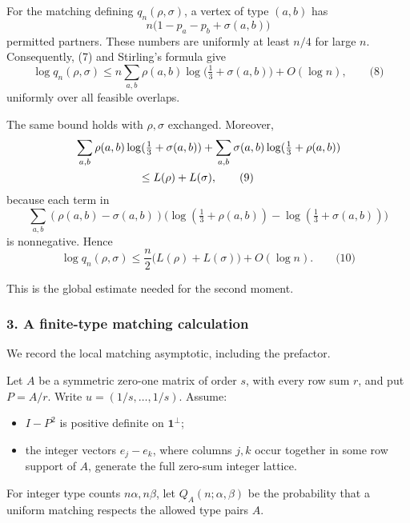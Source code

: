 \documentclass[
  11pt,
  a4paper,
]{article}
\providecommand{\tightlist}{%
  \setlength{\itemsep}{0pt}\setlength{\parskip}{0pt}}
\begin{document}
For the matching defining \(q_n(\rho,\sigma)\), a vertex of type
\((a,b)\) has \[
n\bigl(1-p_a-p_b+\sigma(a,b)\bigr)
\] permitted partners. These numbers are uniformly at least \(n/4\) for
large \(n\). Consequently, (7) and Stirling's formula give \[
\log q_n(\rho,\sigma)
 \le n\sum_{a,b}\rho(a,b)
                \log\bigl(\tfrac13+\sigma(a,b)\bigr)+O(\log n),  \qquad\text{(8)}
\] uniformly over all feasible overlaps.

The same bound holds with \(\rho,\sigma\) exchanged. Moreover,
\begin{equation*}
\begin{split}
&\sum_{a,b}\rho(a,b)\log(\tfrac13+\sigma(a,b))
 +\sum_{a,b}\sigma(a,b)\log(\tfrac13+\rho(a,b))\\
&\hspace{20mm}\le L(\rho)+L(\sigma),                              \qquad\text{(9)}
\end{split}
\end{equation*} because each term in \[
\sum_{a,b}(\rho(a,b)-\sigma(a,b))
 \bigl(\log(\tfrac13+\rho(a,b))-\log(\tfrac13+\sigma(a,b))\bigr)
\] is nonnegative. Hence \[
\log q_n(\rho,\sigma)
 \le \frac n2\bigl(L(\rho)+L(\sigma)\bigr)+O(\log n).              \qquad\text{(10)}
\]

This is the global estimate needed for the second moment.

\subsubsection{3. A finite-type matching
calculation}\label{a-finite-type-matching-calculation}

We record the local matching asymptotic, including the prefactor.

Let \(A\) be a symmetric zero-one matrix of order \(s\), with every row
sum \(r\), and put \(P=A/r\). Write \(u=(1/s,\ldots,1/s)\). Assume:

\begin{itemize}
\tightlist
\item
  \(I-P^2\) is positive definite on \(\mathbf1^\perp\);
\item
  the integer vectors \(e_j-e_k\), where columns \(j,k\) occur together
  in some row support of \(A\), generate the full zero-sum integer
  lattice.
\end{itemize}

For integer type counts \(n\alpha,n\beta\), let \(Q_A(n;\alpha,\beta)\)
be the probability that a uniform matching respects the allowed type
pairs \(A\).
\end{document}
